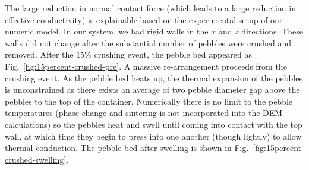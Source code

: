 The large reduction in normal contact force (which leads to a large reduction in effective conductivity) is explainable based on the experimental setup of our numeric model. In our system, we had rigid walls in the $x$ and $z$ directions. These walls did not change after the substantial number of pebbles were crushed and removed. After the 15\% crushing event, the pebble bed appeared as Fig.~\ref{fig:15percent-crushed-pre}. A massive re-arrangement proceeds from the crushing event. As the pebble bed heats up, the thermal expansion of the pebbles is unconstrained as there exists an average of two pebble diameter gap above the pebbles to the top of the container. Numerically there is no limit to the pebble temperatures (phase change and sintering is not incorporated into the DEM calculations) so the pebbles heat and swell until coming into contact with the top wall, at which time they begin to press into one another (though lightly) to allow thermal conduction. The pebble bed after swelling is shown in Fig.~\ref{fig:15percent-crushed-swelling}.

